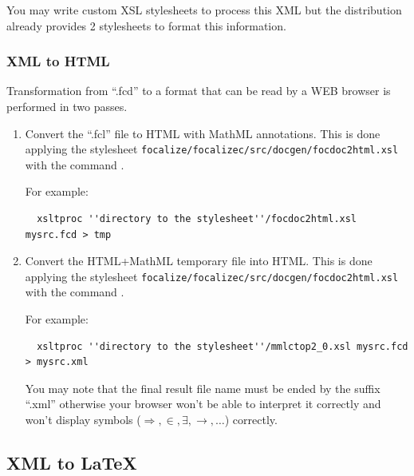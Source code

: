 You may write custom XSL stylesheets to process this XML but the
distribution already provides 2 stylesheets to format this
information.



\subsubsection{XML to HTML}
Transformation from ``.fcd'' to a format that can be read by a WEB
browser is performed in two passes.
\begin{enumerate}
  \item Convert the ``.fcl'' file to HTML with MathML annotations.
  This is done applying the stylesheet
  {\tt focalize/focalizec/src/docgen/focdoc2html.xsl} with the command
  \xsltproc.

  For example:
  {\scriptsize
  \begin{verbatim}
  xsltproc ''directory to the stylesheet''/focdoc2html.xsl mysrc.fcd > tmp
  \end{verbatim}
  }

  \item Convert the HTML+MathML temporary file into HTML.
  This is done applying the stylesheet
  {\tt focalize/focalizec/src/docgen/focdoc2html.xsl} with the command
  \xsltproc.

  For example:
  {\scriptsize
  \begin{verbatim}
  xsltproc ''directory to the stylesheet''/mmlctop2_0.xsl mysrc.fcd > mysrc.xml
  \end{verbatim}
  }
  You may note that the final result file name must be ended by the
  suffix ``.xml'' otherwise your browser won't be able to interpret it
  correctly and won't display symbols ($\Rightarrow, \in, \exists,
  \rightarrow, \ldots$) correctly.
\end{enumerate}

\subsection{XML to LaTeX}
